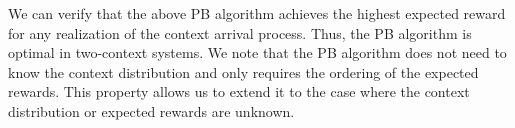 We can verify that the above PB algorithm achieves the highest expected reward for any realization of the context arrival process.
Thus, the PB algorithm is optimal in two-context systems. We note that the PB algorithm does not need to know the context distribution and only requires the ordering of the expected rewards. This property allows us to extend it to the case where the context distribution or expected rewards are unknown.
%
